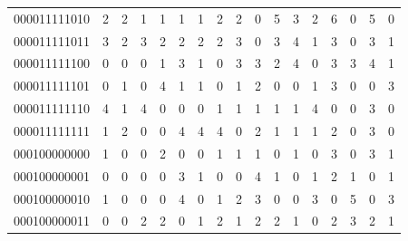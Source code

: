 \documentclass[10pt,a4paper]{article}
\begin{document}
\begin{longtable}{ |c|c|c|c|c|c|c|c|c|c|c|c|c|c|c|c|c| }
    000011111010              & 2                            & 2                                & 1                            & 1                              & 1   & 1   & 2   & 2   & 0   & 5   & 3   & 2   & 6   & 0   & 5   & 0   \\
    000011111011              & 3                            & 2                                & 3                            & 2                              & 2   & 2   & 2   & 3   & 0   & 3   & 4   & 1   & 3   & 0   & 3   & 1   \\
    000011111100              & 0                            & 0                                & 0                            & 1                              & 3   & 1   & 0   & 3   & 3   & 2   & 4   & 0   & 3   & 3   & 4   & 1   \\
    000011111101              & 0                            & 1                                & 0                            & 4                              & 1   & 1   & 0   & 1   & 2   & 0   & 0   & 1   & 3   & 0   & 0   & 3   \\
    000011111110              & 4                            & 1                                & 4                            & 0                              & 0   & 0   & 1   & 1   & 1   & 1   & 1   & 4   & 0   & 0   & 3   & 0   \\
    000011111111              & 1                            & 2                                & 0                            & 0                              & 4   & 4   & 4   & 0   & 2   & 1   & 1   & 1   & 2   & 0   & 3   & 0   \\
    000100000000              & 1                            & 0                                & 0                            & 2                              & 0   & 0   & 1   & 1   & 1   & 0   & 1   & 0   & 3   & 0   & 3   & 1   \\
    000100000001              & 0                            & 0                                & 0                            & 0                              & 3   & 1   & 0   & 0   & 4   & 1   & 0   & 1   & 2   & 1   & 0   & 1   \\
    000100000010              & 1                            & 0                                & 0                            & 0                              & 4   & 0   & 1   & 2   & 3   & 0   & 0   & 3   & 0   & 5   & 0   & 3   \\
    000100000011              & 0                            & 0                                & 2                            & 2                              & 0   & 1   & 2   & 1   & 2   & 2   & 1   & 0   & 2   & 3   & 2   & 1   \\

\end{longtable}
\end{document}
